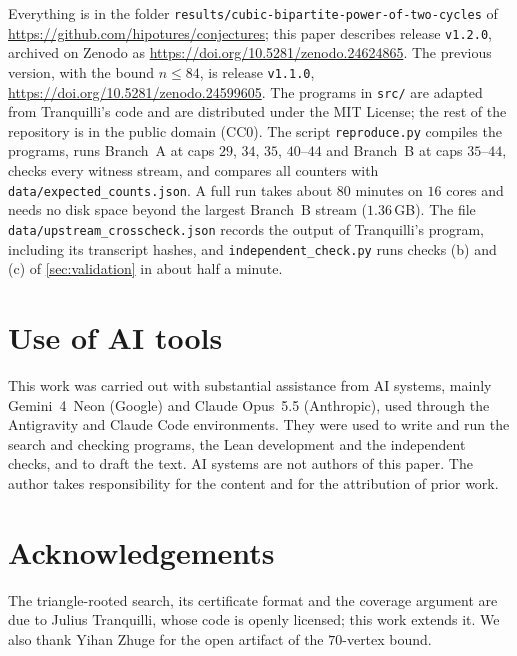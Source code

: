\documentclass[11pt]{amsart}
\theoremstyle{definition}
\theoremstyle{remark}
\newcommand{\code}[1]{\texttt{#1}}
\begin{document}
Everything is in the folder \code{results/cubic-bipartite-power-of-two-cycles} of
\url{https://github.com/hipotures/conjectures}; this paper describes release
\code{v1.2.0}, archived on Zenodo as \url{https://doi.org/10.5281/zenodo.24624865}. The previous version, with the bound $n\le 84$, is release
\code{v1.1.0}, \url{https://doi.org/10.5281/zenodo.24599605}. The programs in \code{src/} are
adapted from Tranquilli's code and are distributed under the MIT License; the
rest of the repository is in the public domain (CC0). The script
\code{reproduce.py} compiles the programs, runs Branch~A at caps $29$, $34$, $35$,
$40$--$44$ and Branch~B at caps $35$--$44$, checks every witness stream,
and compares all counters with \code{data/expected\_counts.json}. A full run
takes about $80$ minutes on $16$ cores and needs no disk space beyond the largest
Branch~B stream ($1.36$\,GB). The file \code{data/upstream\_crosscheck.json}
records the output of Tranquilli's program, including its transcript hashes,
and \code{independent\_check.py} runs checks (b) and (c) of
\cref{sec:validation} in about half a minute.

\section*{Use of AI tools}
This work was carried out with substantial assistance from AI systems, mainly
Gemini~4~Neon (Google) and Claude Opus~5.5 (Anthropic), used through the
Antigravity and Claude Code environments. They were used to write and run the
search and checking programs, the Lean development and the independent checks,
and to draft the text. AI systems are not authors of this paper. The author
takes responsibility for the content and for the attribution of prior work.

\section*{Acknowledgements}
The triangle-rooted search, its certificate format and the coverage argument
are due to Julius Tranquilli, whose code is openly licensed; this work extends
it. We also thank Yihan Zhuge for the open artifact of the $70$-vertex bound.
\end{document}
